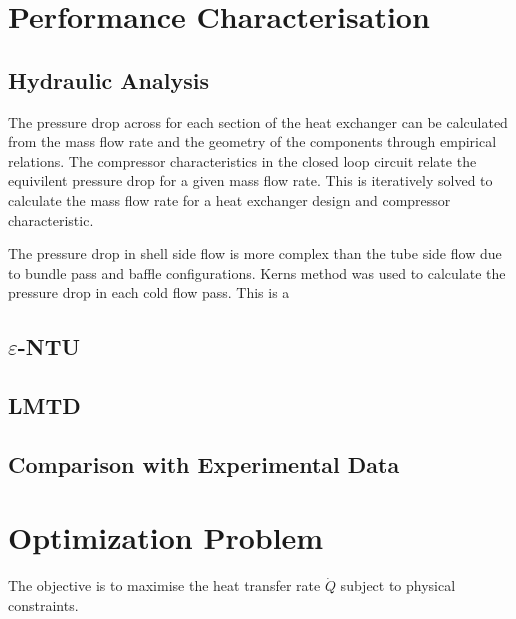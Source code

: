 \documentclass{article}
\begin{document}

\section{Performance Characterisation}

\subsection{Hydraulic Analysis}

The pressure drop across for each section of the heat exchanger can be calculated from the mass flow rate and the geometry of the components through empirical relations.
The compressor characteristics in the closed loop circuit relate the equivilent pressure drop for a given mass flow rate.
This is iteratively solved to calculate the mass flow rate for a heat exchanger design and compressor characteristic.

The pressure drop in shell side flow is more complex than the tube side flow due to bundle pass and baffle configurations.
Kerns method was used to calculate the pressure drop in each cold flow pass. This is a 


\subsection{$\varepsilon$-NTU}

\subsection{LMTD}

\subsection{Comparison with Experimental Data}

\section{Optimization Problem}

The objective is to maximise the heat transfer rate $\dot{Q}$ subject to physical constraints.
\end{document}
